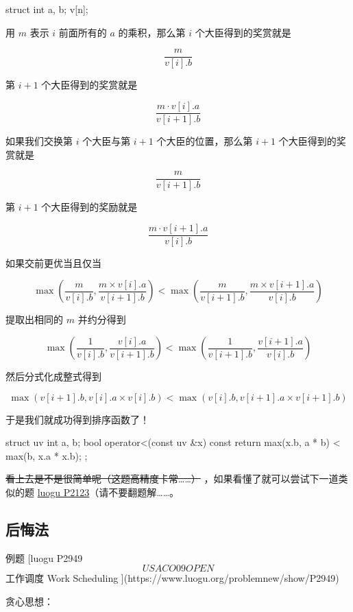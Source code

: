 \begin{cppcode}
struct {
  int a, b;
} v[n];
\end{cppcode}

用 $m$ 表示 $i$ 前面所有的 $a$ 的乘积，那么第 $i$ 个大臣得到的奖赏就是 

$$
\frac{m} {v[i].b}
$$

第 $i + 1$ 个大臣得到的奖赏就是 

$$
\frac{m \cdot v[i].a} {v[i + 1].b}
$$

如果我们交换第 $i$ 个大臣与第 $i + 1$ 个大臣的位置，那么第 $i + 1$ 个大臣得到的奖赏就是 

$$
\frac{m} {v[i + 1].b}
$$

第 $i + 1$ 个大臣得到的奖励就是 

$$
\frac{m \cdot v[i + 1].a} {v[i].b}
$$

如果交前更优当且仅当 

$$
\max (\frac{m} {v[i].b}, \frac{m \times v[i].a} {v[i + 1].b})  < \max (\frac{m} {v[i + 1].b}, \frac{m \times v[i + 1].a} {v[i].b})
$$

提取出相同的 $m$ 并约分得到 

$$
\max(\frac{1} {v[i].b}, \frac{v[i].a} {v[i + 1].b}) < \max(\frac{1} {v[i + 1].b}, \frac{v[i + 1].a} {v[i].b})
$$

然后分式化成整式得到 

$$
\max(v[i + 1].b, v[i].a \times v[i].b) < \max(v[i].b, v[i + 1].a \times v[i + 1].b)
$$

于是我们就成功得到排序函数了！

\begin{cppcode}
struct uv {
  int a, b;
  bool operator<(const uv &x) const {
    return max(x.b, a * b) < max(b, x.a * x.b);
  }
};
\end{cppcode}

\st{看上去是不是很简单呢（这题高精度卡常……）} ，如果看懂了就可以尝试下一道类似的题 \href{https://www.luogu.org/problemnew/show/P2123}{luogu P2123}（请不要翻题解……。

\subsection{后悔法}

\begin{NOTE}{ 例题 [luogu P2949 \[USACO09OPEN\] 工作调度 Work Scheduling ](https://www.luogu.org/problemnew/show/P2949)}{}

\end{NOTE}


贪心思想：

